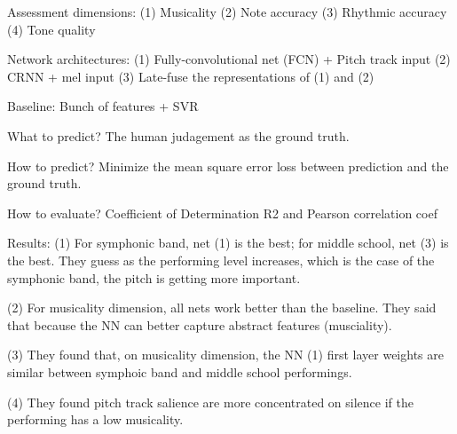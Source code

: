 Assessment dimensions: (1) Musicality (2) Note accuracy (3) Rhythmic accuracy (4) Tone quality

Network architectures:
(1) Fully-convolutional net (FCN) + Pitch track input
(2) CRNN + mel input
(3) Late-fuse the representations of (1) and (2)

Baseline:
Bunch of features + SVR

What to predict?
The human judagement as the ground truth.

How to predict?
Minimize the mean square error loss between prediction and the ground truth.

How to evaluate?
Coefficient of Determination R2 and Pearson correlation coef

Results:
(1) For symphonic band, net (1) is the best; for middle school, net (3) is the best. They guess as the performing level increases, which is the case of the symphonic band, the pitch is getting more important.

(2) For musicality dimension, all nets work better than the baseline. They said that because the NN can better capture abstract features (musciality).

(3) They found that, on musicality dimension, the NN (1) first layer weights are similar between symphoic band and middle school performings.

(4) They found pitch track salience are more concentrated on silence if the performing has a low musicality.

